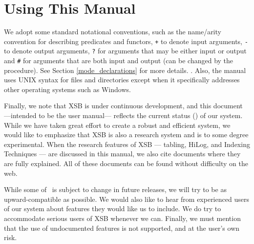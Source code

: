 \section{Using This Manual}
We adopt some standard notational conventions, such as the name/arity
convention for describing predicates and functors, {\tt +} to denote
input arguments, {\tt -} to denote output arguments, {\tt ?} for
arguments that may be either input or output and {\tt \#} for
arguments that are both input and output (can be changed by the
procedure).  See Section \ref{mode_declarations} for more details.
.  Also, the manual uses UNIX syntax for
files and directories except when it specifically addresses other
operating systems such as Windows.

Finally, we note that XSB is under continuous development, and this
document ---intended to be the user manual--- reflects the current
status (\version) of our system.  While we have taken great effort to
create a robust and efficient system, we would like to emphasize that
XSB is also a research system and is to some degree experimental.
When the research features of XSB --- tabling, HiLog, and Indexing
Techniques --- are discussed in this manual, we also cite documents
where they are fully explained.  All of these documents can be found
without difficulty on the web.

While some of \version\ is subject to change in future releases, we
will try to be as upward-compatible as possible. We would also like to
hear from experienced users of our system about features they would
like us to include.  We do try to accommodate serious users of XSB
whenever we can.  Finally, we must mention that the use of
undocumented features is not supported, and at the user's own risk.



